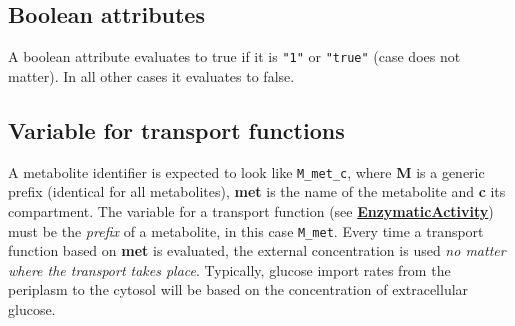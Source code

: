 \documentclass[12pt]{scrartcl}
\newcommand{\enzymaticactivity}{\hyperref[sec:enzymatic_activity]{\textbf{EnzymaticActivity}}}
\begin{document}
\subsection{Boolean attributes}

A boolean attribute evaluates to true if it is \texttt{"1"}
or \texttt{"true"} (case does not matter).
In all other cases it evaluates to false.

\subsection{Variable for transport functions}

A metabolite identifier is expected to look like \texttt{M\_met\_c},
where \textbf{M} is a generic prefix (identical for all metabolites),
\textbf{met} is the name of the metabolite
and \textbf{c} its compartment.
The variable for a transport function (see \enzymaticactivity) must be the
\emph{prefix} of a metabolite, in this case \texttt{M\_met}.
Every time a transport function based on \textbf{met} is evaluated,
the external concentration is used
\emph{no matter where the transport takes place}.
Typically, glucose import rates from the periplasm to the cytosol
will be based on the concentration of extracellular glucose.






\end{document}
